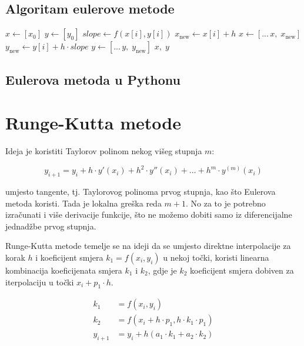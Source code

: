 \begin{multicols}{2}
\subsection{Algoritam eulerove metode}

\begin{algorithmic}
        \State $x \gets [x_0]$
        \State $y \gets [y_0]$
        \For{$i \in [0, n\rangle$}
            \State $slope \gets f(x[i], y[i])$
            \State $x_{\text{new}} \gets x[i] + h$
            \State $x \gets [...\,x,\;x_{\text{new}}]$
            \State $y_{\text{new}} \gets y[i] + h \cdot slope$
            \State $y \gets [...\,y,\;y_{\text{new}}]$
        \EndFor
        \State \Return $x,\;y$
    \EndFunction
\end{algorithmic}

\columnbreak

\subsection{Eulerova metoda u Pythonu}


\end{multicols}

\section{Runge-Kutta metode}

Ideja je koristiti Taylorov polinom nekog višeg stupnja $m$:

$$
y_{i+1} = y_i + h\cdot y'(x_i) + h^2 \cdot y''(x_i) + \dots + h^m \cdot y^{(m)}(x_i)
$$

umjesto tangente, tj. Taylorovog polinoma prvog stupnja, kao što Eulerova metoda
koristi. Tada je lokalna greška reda $m + 1$. No za to je potrebno izračunati i
više derivacije funkcije, što ne možemo dobiti samo iz diferencijalne jednadžbe
prvog stupnja.

\bigskip
Runge-Kutta metode temelje se na ideji da se umjesto direktne interpolacije za
korak $h$ i koeficijent smjera $k_1 = f(x_i,y_i)$ u nekoj točki, koristi
linearna kombinacija koeficijenata smjera $k_1$ i $k_2$, gdje je $k_2$
koeficijent smjera dobiven za iterpolaciju u točki $x_i + p_1\cdot h$.

\begin{align*}
    k_1 &= f(x_i,y_i)\\
    k_2 &= f(x_i + h \cdot p_1,h\cdot k_1\cdot p_1)\\
    y_{i+1} &= y_i + h (a_1\cdot k_1 + a_2 \cdot k_2)
\end{align*}

